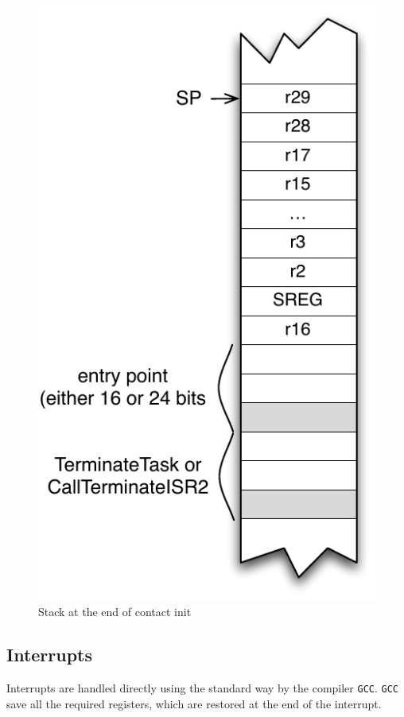 \begin{figure}[htbp] %
\begin{minipage}{0.4\textwidth}
    \centering
  \includegraphics[scale=.6]{pictures/avr8-stackInit.pdf} 
\end{minipage}
\begin{minipage}{0.6\textwidth}
  \caption{Stack at the end of contact init}\label{fig:avr8-stackInit}
\end{minipage}
\end{figure}

\subsection{Interrupts}
Interrupts are handled directly using the standard way by the compiler \texttt{GCC}. \texttt{GCC} save all the required registers, which are restored at the end of the interrupt.

